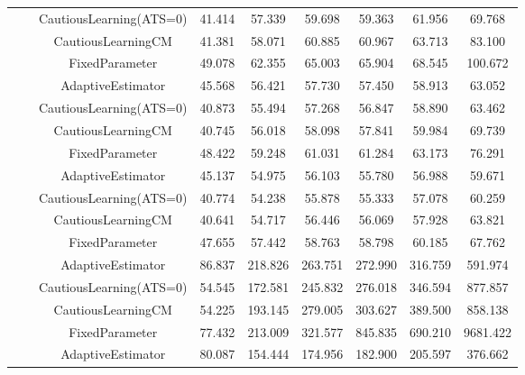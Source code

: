 \begin{table}[!h]
\begin{tabular}[t]{ccccccccc}
 &  & CautiousLearning(ATS=0) & 41.414 & 57.339 & 59.698 & 59.363 & 61.956 & 69.768\\

 &  & CautiousLearningCM & 41.381 & 58.071 & 60.885 & 60.967 & 63.713 & 83.100\\

 & \multirow[t]{-4}{*}{\centering\arraybackslash 1.00} & FixedParameter & 49.078 & 62.355 & 65.003 & 65.904 & 68.545 & 100.672\\
\cmidrule{2-9}
 &  & AdaptiveEstimator & 45.568 & 56.421 & 57.730 & 57.450 & 58.913 & 63.052\\

 &  & CautiousLearning(ATS=0) & 40.873 & 55.494 & 57.268 & 56.847 & 58.890 & 63.462\\

 &  & CautiousLearningCM & 40.745 & 56.018 & 58.098 & 57.841 & 59.984 & 69.739\\

 & \multirow[t]{-4}{*}{\centering\arraybackslash 1.25} & FixedParameter & 48.422 & 59.248 & 61.031 & 61.284 & 63.173 & 76.291\\
\cmidrule{2-9}
 &  & AdaptiveEstimator & 45.137 & 54.975 & 56.103 & 55.780 & 56.988 & 59.671\\

 &  & CautiousLearning(ATS=0) & 40.774 & 54.238 & 55.878 & 55.333 & 57.078 & 60.259\\

 &  & CautiousLearningCM & 40.641 & 54.717 & 56.446 & 56.069 & 57.928 & 63.821\\

\multirow[t]{-28}{*}{\centering\arraybackslash 50} & \multirow[t]{-4}{*}{\centering\arraybackslash 1.50} & FixedParameter & 47.655 & 57.442 & 58.763 & 58.798 & 60.185 & 67.762\\
\cmidrule{1-9}
 &  & AdaptiveEstimator & 86.837 & 218.826 & 263.751 & 272.990 & 316.759 & 591.974\\

 &  & CautiousLearning(ATS=0) & 54.545 & 172.581 & 245.832 & 276.018 & 346.594 & 877.857\\

 &  & CautiousLearningCM & 54.225 & 193.145 & 279.005 & 303.627 & 389.500 & 858.138\\

 & \multirow[t]{-4}{*}{\centering\arraybackslash 0.25} & FixedParameter & 77.432 & 213.009 & 321.577 & 845.835 & 690.210 & 9681.422\\
\cmidrule{2-9}
 &  & AdaptiveEstimator & 80.087 & 154.444 & 174.956 & 182.900 & 205.597 & 376.662\\


\end{tabular}
\end{table}
